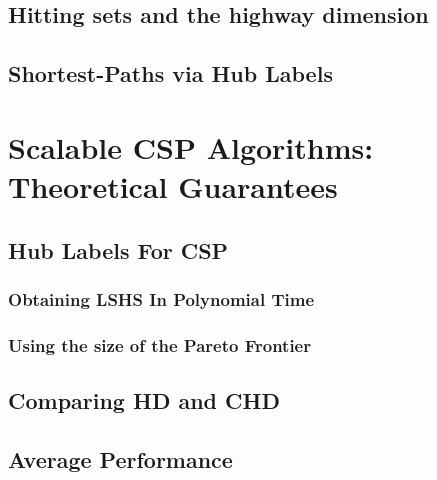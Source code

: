 \documentclass[screen,sigconf,anonymous,review]{acmart}
\begin{document}
\subsection{Hitting sets and the highway dimension}
\label{ssec:hddef}


\subsection{Shortest-Paths via Hub Labels}
\label{ssec:hldef}


\section{Scalable CSP Algorithms:\texorpdfstring{\\}{ } Theoretical Guarantees}
\label{sec:chd}


\subsection{Hub Labels For CSP}
\label{ssec:aug}


\label{ssec:hlcsp}


\subsubsection{Obtaining LSHS In Polynomial Time}
\label{sec:preproc}


\subsubsection{Using the size of the Pareto Frontier}
\label{sec:frontier}


\subsection{Comparing HD and CHD}
\label{ssec:hdvschd}


\subsection{Average Performance}
\label{sec:avg_hd}

\end{document}
